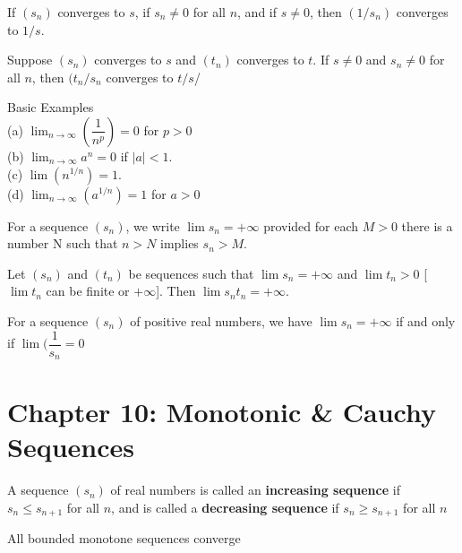 \documentclass[twoside, 10pt]{article}
\begin{document}
\begin{lem}
If $(s_n)$ converges to $s$, if $s_n \neq 0$ for all $n$, and if $s \neq 0$, then $(1/s_n)$ converges to $1/s$. 
\end{lem}

\begin{thm}
Suppose $(s_n)$ converges to $s$ and $(t_n)$ converges to $t$. If $s \neq 0$ and $s_n \neq 0$ for all $n$, then $(t_n/s_n$ converges to $t/s$/
\end{thm}

\begin{thm} Basic Examples\\
(a) $\lim_{n \to \infty} (\dfrac{1}{n^p}) = 0$ for $p > 0$\\
(b) $\lim_{n \to \infty} a^n = 0$ if $|a| < 1$.\\
(c) $\lim(n^{1/n}) = 1$.\\
(d) $\lim_{n \to \infty}(a^{1/n}) = 1$ for $a > 0$
\end{thm}

\begin{defn}
For a sequence $(s_n)$, we write $\lim s_n = + \infty$ provided for each $M > 0$ there is a number N such that $n > N$ implies $s_n > M$.
\end{defn}

\begin{thm}
Let $(s_n)$ and $(t_n)$ be sequences such that $\lim s_n = +\infty$ and $\lim t_n > 0$ [$\lim t_n$ can be finite or $+\infty$]. Then $\lim s_nt_n = +\infty$.
\end{thm}

\begin{thm}
For a sequence $(s_n)$ of positive real numbers, we have $\lim s_n = +\infty$ if and only if $\lim(\dfrac{1}{s_n} = 0$
\end{thm}

\section*{Chapter 10: Monotonic \& Cauchy Sequences}
\begin{defn}
A sequence $(s_n)$ of real numbers is called an \textbf{increasing sequence} if $s_n \leq s_{n+1}$ for all $n$, and is called a \textbf{decreasing sequence} if $s_n \geq s_{n+1}$ for all $n$
\end{defn}

\begin{thm}
All bounded monotone sequences converge
\end{thm}
\end{document}

